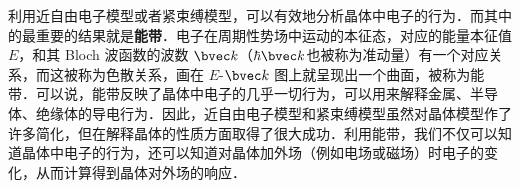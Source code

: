 
利用近自由电子模型或者紧束缚模型，可以有效地分析晶体中电子的行为．而其中的最重要的结果就是\textbf{能带}．电子在周期性势场中运动的本征态，对应的能量本征值 $E$，和其 Bloch 波函数的波数 $\bvec k$（$\hbar \bvec k$也被称为准动量）有一个对应关系，而这被称为色散关系，画在 $E$-${\bvec k}$ 图上就呈现出一个曲面，被称为能带．可以说，能带反映了晶体中电子的几乎一切行为，可以用来解释金属、半导体、绝缘体的导电行为．因此，近自由电子模型和紧束缚模型虽然对晶体模型作了许多简化，但在解释晶体的性质方面取得了很大成功．利用能带，我们不仅可以知道晶体中电子的行为，还可以知道对晶体加外场（例如电场或磁场）时电子的变化，从而计算得到晶体对外场的响应．